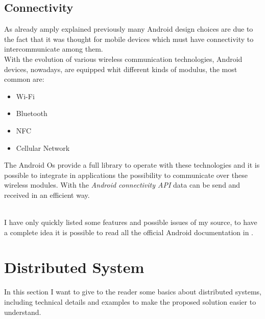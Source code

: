 \subsection{Connectivity}\label{connectivity}
\par
As already amply explained previously many Android design choices are due to the fact that it was thought for mobile devices which must have connectivity to intercommunicate among them.\\
With the evolution of various wireless communication technologies, Android devices, nowadays, are equipped whit different kinds of modulus, the most common are:
\begin{itemize}
	\item Wi-Fi
	\item Bluetooth
	\item NFC
	\item Cellular Network
\end{itemize}
The Android Os provide a full library to operate with these technologies and it is possible to integrate in applications the possibility to communicate over these wireless modules.
With the \textit{Android connectivity API} data can be send and received in an efficient way.\\\\
\par
I have only quickly listed some features and possible issues of my source, to have a complete idea it is possible to read all the official Android documentation in \cite{devandroifundamentals}.
 
\section{Distributed System} \label{distsys}
In this section I want to give to the reader some basics about distributed systems, including technical details and examples to make the proposed solution easier to understand.

